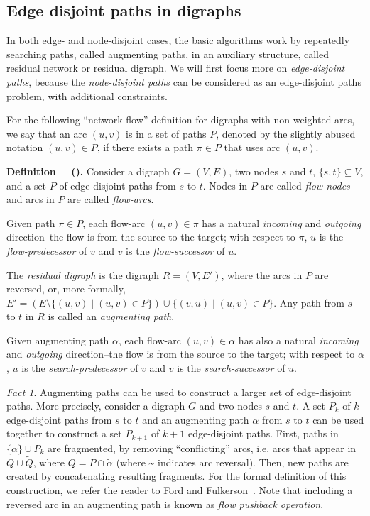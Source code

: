 \documentclass[preliminary,copyright,creativecommons]{eptcs}
\newenvironment{definition}[1][]
   {\refstepcounter{theorem} \par\medskip\noindent
   {\bf Definition~\thetheorem \ifx #1 \else ~(#1)\fi.} 
\ignorespaces }
   {\par\medskip }
\theoremstyle{remark}
\newtheorem{fact}[theorem]{Fact}
\begin{document}
\subsection{Edge disjoint paths in digraphs}
\label{sec-edge-disjoint-paths}

In both edge- and node-disjoint cases, 
the basic algorithms work by repeatedly searching paths,
called augmenting paths, in an auxiliary structure, called residual network
or residual digraph.
We will first focus more on \emph{edge-disjoint paths}, 
because the \emph{node-disjoint paths}
can be considered as an edge-disjoint paths problem, with additional constraints. 

For the following ``network flow'' definition for digraphs with non-weighted
arcs, we say that an arc $(u,v)$ is in a set of paths $P$, denoted 
by the slightly abused notation $(u,v) \in P$, if there exists 
a path $\pi \in P$ that uses arc $(u,v)$.

\begin{definition}
Consider a digraph $G=(V,E)$, two nodes $s$ and $t$, $\{s, t\} \subseteq V$, 
and a set $P$ of edge-disjoint paths from $s$ to $t$.
Nodes in $P$ are called \emph{flow-nodes} and 
arcs in $P$ are called \emph{flow-arcs}.

Given path $\pi \in P$, each flow-arc $(u,v) \in \pi$ has a natural 
\emph{incoming} and \emph{outgoing} direction--the flow is from the source to the target;
with respect to $\pi$, $u$ is the \emph{flow-predecessor} of $v$ and 
$v$ is the \emph{flow-successor} of $u$.

The \emph{residual digraph} is the digraph $R=(V,E')$, 
where the arcs in $P$ are reversed, or, more formally,
$E'= (E \setminus \{(u,v) \mid (u,v) \in P\}) \cup \{(v,u) \mid (u,v) \in P\}$.
Any path from $s$ to $t$ in $R$ is called an \emph{augmenting path}.

Given augmenting path $\alpha$, each flow-arc $(u,v) \in \alpha$ has also a natural 
\emph{incoming} and \emph{outgoing} direction--the flow is from the source to the target;
with respect to $\alpha$, $u$ is the \emph{search-predecessor} of $v$ and 
$v$ is the \emph{search-successor} of $u$.
\end{definition}

\begin{fact}
\label{fact-augmenting}
Augmenting paths can be used to construct a larger set of edge-disjoint paths.
More precisely, consider a digraph $G$ and two nodes $s$ and $t$.
A set $P_k$ of $k$ edge-disjoint paths from $s$ to $t$
and an augmenting path $\alpha$ from $s$ to $t$
can be used together to construct a set $P_{k + 1}$ of $k + 1$ edge-disjoint paths.
First, paths in $\{ \alpha \} \cup P_k$ are fragmented, by 
removing ``conflicting'' arcs, i.e. arcs that appear in $Q \cup \tilde{Q}$,
where $Q = P \cap \tilde{\alpha}$ (where \~{} indicates arc reversal).
Then, new paths are created by concatenating resulting fragments.
For the formal definition of this construction,
we refer the reader to Ford and Fulkerson~\cite{FordF1956}.
Note that including a reversed arc in an augmenting path
is known as \emph{flow pushback operation}.
\end{fact}
\end{document}
